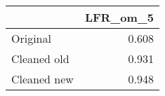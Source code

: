 \begin{tabular}{lr}
\toprule
{} & LFR_om_5 \\
\midrule
Original    &    0.608 \\
Cleaned old &    0.931 \\
Cleaned new &    0.948 \\
\bottomrule
\end{tabular}
